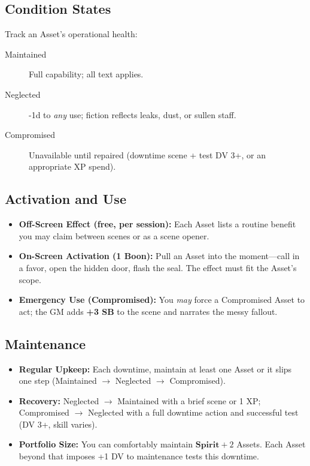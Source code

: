 \subsection*{Condition States}
Track an Asset's operational health:
\begin{description}
  \item[Maintained] Full capability; all text applies.
  \item[Neglected] -1d to \emph{any} use; fiction reflects leaks, dust, or sullen staff.
  \item[Compromised] Unavailable until repaired (downtime scene + test DV 3+, or an appropriate XP spend).
\end{description}

\subsection*{Activation and Use}
\begin{itemize}
  \item \textbf{Off-Screen Effect (free, per session):} Each Asset lists a routine benefit you may claim between scenes or as a scene opener.
  \item \textbf{On-Screen Activation (1 Boon):} Pull an Asset into the moment—call in a favor, open the hidden door, flash the seal. The effect must fit the Asset's scope.
  \item \textbf{Emergency Use (Compromised):} You \emph{may} force a Compromised Asset to act; the GM adds \textbf{+3 SB} to the scene and narrates the messy fallout.
\end{itemize}

\subsection*{Maintenance}
\begin{itemize}
  \item \textbf{Regular Upkeep:} Each downtime, maintain at least one Asset or it slips one step (Maintained \(\rightarrow\) Neglected \(\rightarrow\) Compromised).
  \item \textbf{Recovery:} Neglected \(\rightarrow\) Maintained with a brief scene or 1 XP; Compromised \(\rightarrow\) Neglected with a full downtime action and successful test (DV 3+, skill varies).
  \item \textbf{Portfolio Size:} You can comfortably maintain \(\textbf{Spirit} + 2\) Assets. Each Asset beyond that imposes +1 DV to maintenance tests this downtime. 
\end{itemize}

